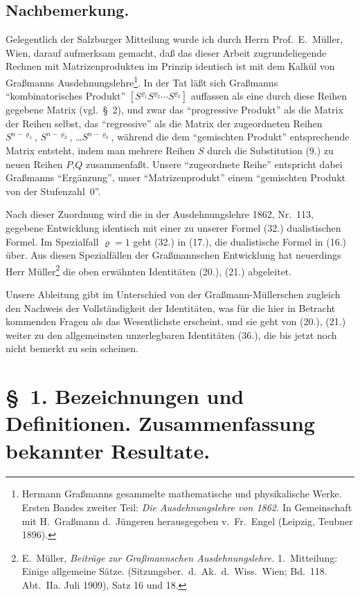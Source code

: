 \documentclass[12pt,a4paper]{article}
\begin{document}
\subsection*{Nachbemerkung.}

Gelegentlich der Salzburger Mitteilung wurde ich durch Herrn Prof.\ E.\ Müller, Wien, darauf aufmerksam gemacht, daß das dieser Arbeit zugrundeliegende Rechnen mit Matrizenprodukten im Prinzip identisch ist mit dem Kalkül von Graßmanns Ausdehnungslehre\footnote{Hermann Graßmanns gesammelte mathematische und physikalische Werke. Ersten Bandes zweiter Teil: \textit{Die Ausdehnungslehre von 1862.} In Gemeinschaft mit H.\ Graßmann d.\ Jüngeren herausgegeben v.\ Fr.\ Engel (Leipzig, Teubner 1896).}. In der Tat läßt sich Graßmanns ``kombinatorisches Produkt'' $[S^{\varrho_{1}} S^{\varrho_{2}} \cdots S^{\varrho_{k}}]$ auffassen als eine durch diese Reihen gegebene Matrix (vgl.\ \S\ 2), und zwar das ``progressive Produkt'' als die Matrix der Reihen selbst, das ``regressive'' als die Matrix der zugeordneten Reihen $S^{n-\varrho_{1}}$, $S^{n-\varrho_{2}}$, \ldots $S^{n-\varrho_{k}}$, während die dem ``gemischten Produkt'' entsprechende Matrix entsteht, indem man mehrere Reihen $S$ durch die Substitution (9.) zu neuen Reihen $P$,$Q$ zusammenfaßt. Unsere ``zugeordnete Reihe'' entspricht dabei Graßmanns ``Ergänzung'', unser ``Matrizenprodukt'' einem ``gemischten Produkt von der Stufenzahl~$0$''.

Nach dieser Zuordnung wird die in der Ausdehnungslehre 1862, Nr.~113, gegebene Entwicklung identisch mit einer zu unserer Formel (32.) dualistischen Formel. Im Spezialfall $\varrho=1$ geht (32.) in (17.), die dualistische Formel in (16.) über. Aus diesen Spezialfällen der Graßmannschen Entwicklung hat neuerdings Herr Müller\footnote{E.\ Müller, \textit{Beiträge zur Graßmannschen Ausdehnungslehre.} 1.\ Mitteilung: Einige allgemeine Sätze. (Sitzungsber.\ d.\ Ak.\ d.\ Wiss.\ Wien; Bd.~118. Abt.\ IIa. Juli 1909), Satz 16 und 18.} die oben erwähnten Identitäten (20.), (21.) abgeleitet.

Unsere Ableitung gibt im Unterschied von der Graßmann-Müllerschen zugleich den Nachweis der Vollständigkeit der Identitäten, was für die hier in Betracht kommenden Fragen als das Wesentlichste erscheint, und sie geht von (20.), (21.) weiter zu den allgemeinsten unzerlegbaren Identitäten (36.), die bis jetzt noch nicht bemerkt zu sein scheinen.

\section*{\S\ 1. Bezeichnungen und Definitionen. Zusammenfassung bekannter Resultate.}
\end{document}
